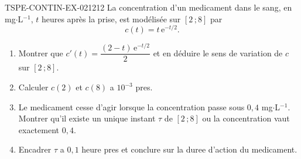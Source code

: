 \begin{exercice}{TSPE-CONTIN-EX-021}{2}{12}
La concentration d'un medicament dans le sang, en mg$\cdot$L$^{-1}$, $t$ heures après la prise, est modélisée sur $[2\,;8]$ par
\[ c(t) = t\,\mathrm{e}^{-t/2}. \]
\begin{enumerate}
  \item Montrer que $c'(t) = \dfrac{(2-t)\,\mathrm{e}^{-t/2}}{2}$ et en déduire le sens de variation de $c$ sur $[2\,;8]$.
  \item Calculer $c(2)$ et $c(8)$ a $10^{-3}$ pres.
  \item Le medicament cesse d'agir lorsque la concentration passe sous $0{,}4$ mg$\cdot$L$^{-1}$. Montrer qu'il existe un unique instant $\tau$ de $[2\,;8]$ ou la concentration vaut exactement $0{,}4$.
  \item Encadrer $\tau$ a $0{,}1$ heure pres et conclure sur la duree d'action du medicament.
\end{enumerate}
\end{exercice}
